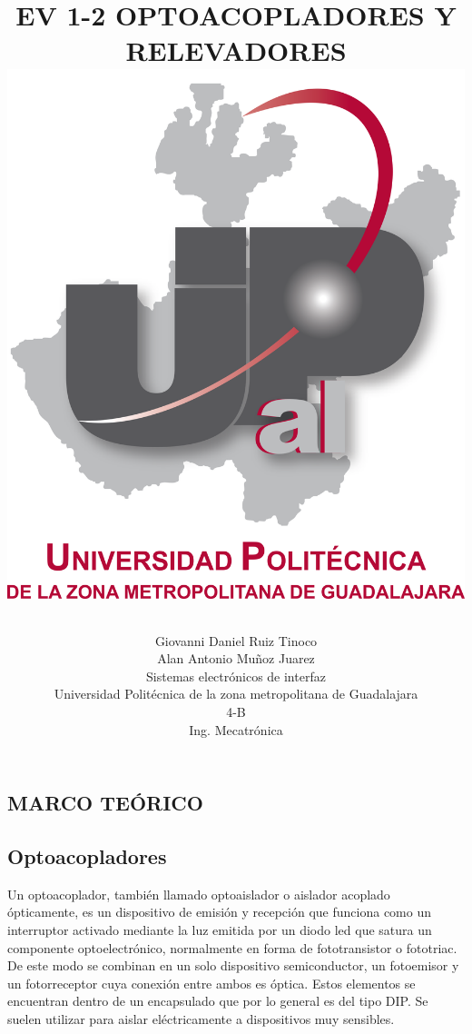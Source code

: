\documentclass[12pt,a4paper]{article}
\title{EV 1-2 OPTOACOPLADORES Y RELEVADORES
\includegraphics [scale=1]{imagenes/UPZMG.png} 
\author{Giovanni Daniel Ruiz Tinoco\\
Alan Antonio Muñoz Juarez\\
\small Sistemas electrónicos de interfaz\\
  \small Universidad Politécnica de la zona metropolitana de Guadalajara\\
  \small 4-B \\
  \small Ing. Mecatrónica\\
\centering
}
}
\begin{document}
\maketitle
\newpage
\begin{center}
\section {MARCO TEÓRICO}
\subsection{Optoacopladores}
\end{center}
Un optoacoplador, también llamado optoaislador o aislador acoplado ópticamente, es un dispositivo de emisión y recepción que funciona como un interruptor activado mediante la luz emitida por un diodo led que satura un componente optoelectrónico, normalmente en forma de fototransistor o fototriac. De este modo se combinan en un solo dispositivo semiconductor, un fotoemisor y un fotorreceptor cuya conexión entre ambos es óptica. Estos elementos se encuentran dentro de un encapsulado que por lo general es del tipo DIP. Se suelen utilizar para aislar eléctricamente a dispositivos muy sensibles.\linebreak
\end{document}

